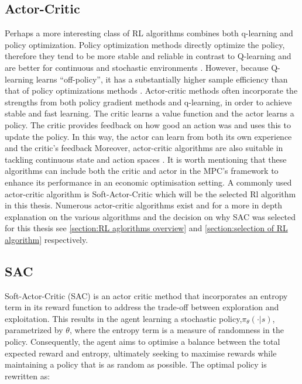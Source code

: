 \subsection{Actor-Critic}
Perhaps a more interesting class of RL algorithms combines both q-learning and policy optimization. Policy optimization methods directly optimize the policy, therefore they tend to be more stable and reliable in contrast to Q-learning and are better for continuous and stochastic environments \cite{suttonReinforcementLearningIntroduction2014}. However, because Q-learning learns ``off-policy'', it has a substantially higher sample efficiency than that of policy optimizations methods \cite{suttonReinforcementLearningIntroduction2014}.
Actor-critic methods often incorporate the strengths from both policy gradient methods and q-learning, in order to achieve stable and fast learning. The critic learns a value function and the actor learns a policy. The critic provides feedback on how good an action was and uses this to update the policy. In this way, the actor can learn from both its own experience and the critic's feedback 
Moreover, actor-critic algorithms are also suitable in tackling continuous state and action spaces \cite{suttonReinforcementLearningIntroduction2014}. It is worth mentioning that these algorithms can include both the critic and actor in the MPC's framework to enhance its performance in an economic optimisation setting. A commonly used actor-critic algorithm  is Soft-Actor-Critic which will be the selected Rl algorithm in this thesis. Numerous actor-critic algorithms exist and for a more in depth explanation on the various algorithms and the decision on why SAC was selected  for this thesis see \autoref{section:RL aglorithms overview} and \autoref{section:selection of RL algorithm} respectively.

\subsection{SAC}
Soft-Actor-Critic (SAC) is an actor critic method that incorporates an entropy term in its reward function to address the trade-off between exploration and exploitation. This results in the agent learning a stochastic policy,$\pi_{\theta}(\cdot|s)$, parametrized by $\theta$, where the entropy term is a measure of randomness in the policy. Consequently, the agent aims to optimise a balance between the total expected reward and entropy, ultimately seeking to maximise rewards while maintaining a policy that is as random as possible. The optimal policy is rewritten as:

